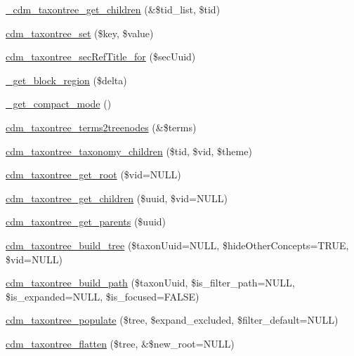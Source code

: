 \begin{DoxyCompactItemize}
\item 
\hyperlink{cdm__taxontree_8module_aa8ca5347667468724abe17ef9a3d403f}{\-\_\-cdm\-\_\-taxontree\-\_\-get\-\_\-children} (\&\$tid\-\_\-list, \$tid)
\item 
\hyperlink{cdm__taxontree_8module_ac85e338f944e9177c518676b1d459d4c}{cdm\-\_\-taxontree\-\_\-set} (\$key, \$value)
\item 
\hyperlink{cdm__taxontree_8module_a767a749643047d8e669e39e59316e43c}{cdm\-\_\-taxontree\-\_\-sec\-Ref\-Title\-\_\-for} (\$sec\-Uuid)
\item 
\hyperlink{cdm__taxontree_8module_ab2e721d177f9f270bbb70bcc3b9208f4}{\-\_\-get\-\_\-block\-\_\-region} (\$delta)
\item 
\hyperlink{cdm__taxontree_8module_a029358f8b8c5447d619543f4b5a4a668}{\-\_\-get\-\_\-compact\-\_\-mode} ()
\item 
\hyperlink{cdm__taxontree_8module_aa08366b4d66995fed6f2c3f345d85216}{cdm\-\_\-taxontree\-\_\-terms2treenodes} (\&\$terms)
\item 
\hyperlink{cdm__taxontree_8module_a049d4c5a90a18d92c456409a0074618e}{cdm\-\_\-taxontree\-\_\-taxonomy\-\_\-children} (\$tid, \$vid, \$theme)
\item 
\hyperlink{cdm__taxontree_8module_ab337b460ec82b89ea11a54a4a97dea72}{cdm\-\_\-taxontree\-\_\-get\-\_\-root} (\$vid=N\-U\-L\-L)
\item 
\hyperlink{cdm__taxontree_8module_a4749a49978bb7d6618424e182df68e27}{cdm\-\_\-taxontree\-\_\-get\-\_\-children} (\$uuid, \$vid=N\-U\-L\-L)
\item 
\hyperlink{cdm__taxontree_8module_ad98a24b0b3185571b140a815de49fc9b}{cdm\-\_\-taxontree\-\_\-get\-\_\-parents} (\$uuid)
\item 
\hyperlink{cdm__taxontree_8module_a5f38a2448c16018937368a7e28cde54a}{cdm\-\_\-taxontree\-\_\-build\-\_\-tree} (\$taxon\-Uuid=N\-U\-L\-L, \$hide\-Other\-Concepts=T\-R\-U\-E, \$vid=N\-U\-L\-L)
\item 
\hyperlink{cdm__taxontree_8module_a7b2e6c95ab4c6159427b02d8ef1e5949}{cdm\-\_\-taxontree\-\_\-build\-\_\-path} (\$taxon\-Uuid, \$is\-\_\-filter\-\_\-path=N\-U\-L\-L, \$is\-\_\-expanded=N\-U\-L\-L, \$is\-\_\-focused=F\-A\-L\-S\-E)
\item 
\hyperlink{cdm__taxontree_8module_a0f2e4c24a11ef42463d36821677d09cf}{cdm\-\_\-taxontree\-\_\-populate} (\$tree, \$expand\-\_\-excluded, \$filter\-\_\-default=N\-U\-L\-L)
\item 
\hyperlink{cdm__taxontree_8module_a1eb8ac673359d148db2bde24c7663d7a}{cdm\-\_\-taxontree\-\_\-flatten} (\$tree, \&\$new\-\_\-root=N\-U\-L\-L)

\end{DoxyCompactItemize}
